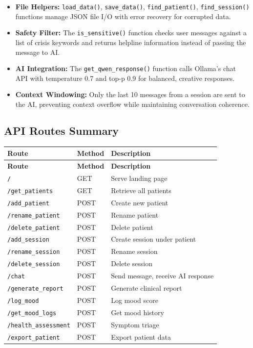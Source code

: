 \documentclass[12pt,a4paper]{report}
\begin{document}
\begin{itemize}
    \item \textbf{File Helpers:} \texttt{load\_data()}, \texttt{save\_data()}, \texttt{find\_patient()}, \texttt{find\_session()} functions manage JSON file I/O with error recovery for corrupted data.
    \item \textbf{Safety Filter:} The \texttt{is\_sensitive()} function checks user messages against a list of crisis keywords and returns helpline information instead of passing the message to AI.
    \item \textbf{AI Integration:} The \texttt{get\_qwen\_response()} function calls Ollama's chat API with temperature 0.7 and top-p 0.9 for balanced, creative responses.
    \item \textbf{Context Windowing:} Only the last 10 messages from a session are sent to the AI, preventing context overflow while maintaining conversation coherence.
\end{itemize}

\subsection{API Routes Summary}

\begin{longtable}{|l|l|p{7cm}|}
\hline
\textbf{Route} & \textbf{Method} & \textbf{Description} \\
\hline
\endfirsthead
\hline
\textbf{Route} & \textbf{Method} & \textbf{Description} \\
\hline
\endhead
\texttt{/} & GET & Serve landing page \\
\hline
\texttt{/get\_patients} & GET & Retrieve all patients \\
\hline
\texttt{/add\_patient} & POST & Create new patient \\
\hline
\texttt{/rename\_patient} & POST & Rename patient \\
\hline
\texttt{/delete\_patient} & POST & Delete patient \\
\hline
\texttt{/add\_session} & POST & Create session under patient \\
\hline
\texttt{/rename\_session} & POST & Rename session \\
\hline
\texttt{/delete\_session} & POST & Delete session \\
\hline
\texttt{/chat} & POST & Send message, receive AI response \\
\hline
\texttt{/generate\_report} & POST & Generate clinical report \\
\hline
\texttt{/log\_mood} & POST & Log mood score \\
\hline
\texttt{/get\_mood\_logs} & POST & Get mood history \\
\hline
\texttt{/health\_assessment} & POST & Symptom triage \\
\hline
\texttt{/export\_patient} & POST & Export patient data \\
\hline
\end{longtable}
\end{document}
